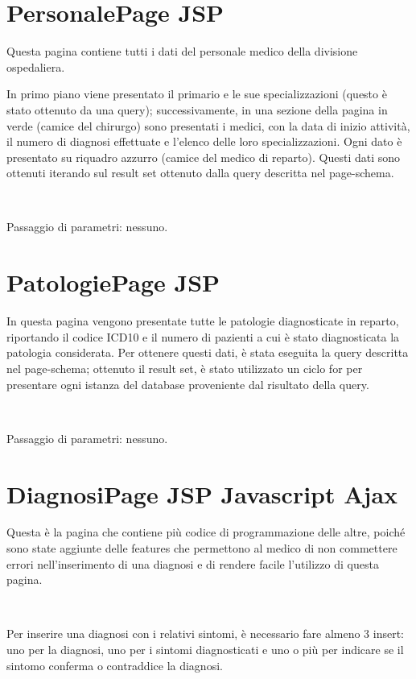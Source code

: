 \documentclass[a4paper,titlepage]{article}
\begin{document}
\section{PersonalePage JSP}

Questa pagina contiene tutti i dati del personale medico della divisione ospedaliera.

In primo piano viene presentato il primario e le sue specializzazioni (questo è stato ottenuto da una query); successivamente, in una sezione della pagina in verde (camice del chirurgo) sono presentati i medici, con la data di inizio attività, il numero di diagnosi effettuate e l'elenco delle loro specializzazioni. Ogni dato è presentato su riquadro azzurro (camice del medico di reparto). Questi dati sono ottenuti iterando sul result set ottenuto dalla query descritta nel page-schema.

~

Passaggio di parametri: nessuno.


\section{PatologiePage JSP}

In questa pagina vengono presentate tutte le patologie diagnosticate in reparto, riportando il codice ICD10 e il numero di pazienti a cui è stato diagnosticata la patologia considerata. Per ottenere questi dati, è stata eseguita la query descritta nel page-schema; ottenuto il result set, è stato utilizzato un ciclo for per presentare ogni istanza del database proveniente dal risultato della query.

~

Passaggio di parametri: nessuno.


\section{DiagnosiPage JSP Javascript Ajax} 

Questa è la pagina che contiene più codice di programmazione delle altre, poiché sono state aggiunte delle features che permettono al medico di non commettere errori nell'inserimento di una diagnosi e di rendere facile l'utilizzo di questa pagina.

~

Per inserire una diagnosi con i relativi sintomi, è necessario fare almeno 3 insert: uno per la diagnosi, uno per i sintomi diagnosticati e uno o più per indicare se il sintomo conferma o contraddice la diagnosi.
\end{document}
